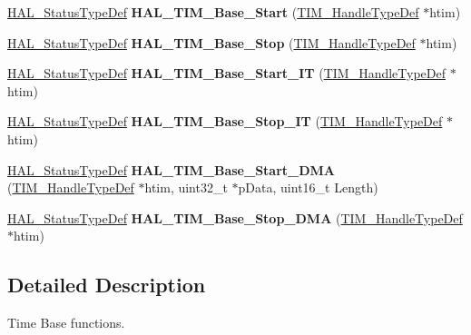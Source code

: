 \begin{DoxyCompactItemize}
\mbox{\hyperlink{stm32f7xx__hal__def_8h_a63c0679d1cb8b8c684fbb0632743478f}{H\+A\+L\+\_\+\+Status\+Type\+Def}} {\bfseries H\+A\+L\+\_\+\+T\+I\+M\+\_\+\+Base\+\_\+\+Start} (\mbox{\hyperlink{struct_t_i_m___handle_type_def}{T\+I\+M\+\_\+\+Handle\+Type\+Def}} $\ast$htim)
\item 
\mbox{\label{group___t_i_m___exported___functions___group1_ga78697261126cd2facc463b81e8c4b238}} 
\mbox{\hyperlink{stm32f7xx__hal__def_8h_a63c0679d1cb8b8c684fbb0632743478f}{H\+A\+L\+\_\+\+Status\+Type\+Def}} {\bfseries H\+A\+L\+\_\+\+T\+I\+M\+\_\+\+Base\+\_\+\+Stop} (\mbox{\hyperlink{struct_t_i_m___handle_type_def}{T\+I\+M\+\_\+\+Handle\+Type\+Def}} $\ast$htim)
\item 
\mbox{\label{group___t_i_m___exported___functions___group1_gae517d80e2ac713069767df8e8915971e}} 
\mbox{\hyperlink{stm32f7xx__hal__def_8h_a63c0679d1cb8b8c684fbb0632743478f}{H\+A\+L\+\_\+\+Status\+Type\+Def}} {\bfseries H\+A\+L\+\_\+\+T\+I\+M\+\_\+\+Base\+\_\+\+Start\+\_\+\+IT} (\mbox{\hyperlink{struct_t_i_m___handle_type_def}{T\+I\+M\+\_\+\+Handle\+Type\+Def}} $\ast$htim)
\item 
\mbox{\label{group___t_i_m___exported___functions___group1_ga19443605c97f15b5ede7d8337534ece4}} 
\mbox{\hyperlink{stm32f7xx__hal__def_8h_a63c0679d1cb8b8c684fbb0632743478f}{H\+A\+L\+\_\+\+Status\+Type\+Def}} {\bfseries H\+A\+L\+\_\+\+T\+I\+M\+\_\+\+Base\+\_\+\+Stop\+\_\+\+IT} (\mbox{\hyperlink{struct_t_i_m___handle_type_def}{T\+I\+M\+\_\+\+Handle\+Type\+Def}} $\ast$htim)
\item 
\mbox{\label{group___t_i_m___exported___functions___group1_ga8246aece4afe559642a6da298f7b157a}} 
\mbox{\hyperlink{stm32f7xx__hal__def_8h_a63c0679d1cb8b8c684fbb0632743478f}{H\+A\+L\+\_\+\+Status\+Type\+Def}} {\bfseries H\+A\+L\+\_\+\+T\+I\+M\+\_\+\+Base\+\_\+\+Start\+\_\+\+D\+MA} (\mbox{\hyperlink{struct_t_i_m___handle_type_def}{T\+I\+M\+\_\+\+Handle\+Type\+Def}} $\ast$htim, uint32\+\_\+t $\ast$p\+Data, uint16\+\_\+t Length)
\item 
\mbox{\label{group___t_i_m___exported___functions___group1_ga7673776de6e35f5cbe887e62e13e87b5}} 
\mbox{\hyperlink{stm32f7xx__hal__def_8h_a63c0679d1cb8b8c684fbb0632743478f}{H\+A\+L\+\_\+\+Status\+Type\+Def}} {\bfseries H\+A\+L\+\_\+\+T\+I\+M\+\_\+\+Base\+\_\+\+Stop\+\_\+\+D\+MA} (\mbox{\hyperlink{struct_t_i_m___handle_type_def}{T\+I\+M\+\_\+\+Handle\+Type\+Def}} $\ast$htim)
\end{DoxyCompactItemize}


\subsection{Detailed Description}
Time Base functions. 

